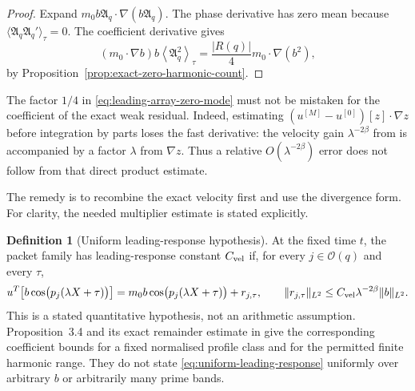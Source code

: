 \documentclass[11pt]{amsart}
\numberwithin{equation}{section}
\theoremstyle{plain}
\theoremstyle{definition}
\newtheorem{definition}[theorem]{Definition}
\theoremstyle{remark}
\begin{document}
\begin{proof}
Expand $m_0b\mathfrak A_q\cdot\nabla(b\mathfrak A_q)$.  The phase derivative
has zero mean because
$\langle\mathfrak A_q\mathfrak A_q'\rangle_\tau=0$.  The coefficient
derivative gives
\begin{equation}
 (m_0\cdot\nabla b)b
 \left\langle\mathfrak A_q^2\right\rangle_\tau
 =\frac{|R(q)|}{4}m_0\cdot\nabla(b^2),
\end{equation}
by Proposition~\ref{prop:exact-zero-harmonic-count}.
\end{proof}

The factor $1/4$ in \eqref{eq:leading-array-zero-mode} must not be mistaken
for the coefficient of the exact weak residual.  Indeed, estimating
$(u^{[M]}-u^{[0]})[z]\cdot\nabla z$ before integration by parts loses the
fast derivative: the velocity gain $\lambda^{-2\beta}$ from
\cite[(33)]{AlpogeBuckmasterCoiculescu2026} is accompanied by a factor
$\lambda$ from $\nabla z$.  Thus a relative $O(\lambda^{-2\beta})$ error does
not follow from that direct product estimate.

The remedy is to recombine the exact velocity first and use the divergence
form.  For clarity, the needed multiplier estimate is stated explicitly.

\begin{definition}[Uniform leading-response hypothesis]
\label{def:uniform-leading-response}
At the fixed time $t$, the packet family has leading-response constant
$C_{\rm vel}$ if, for every $j\in\mathcal O(q)$ and every $\tau$,
\begin{equation}
 u^T\!\left[b\cos\bigl(p_j(\lambda X+\tau)\bigr)\right]
 =m_0b\cos\bigl(p_j(\lambda X+\tau)\bigr)+r_{j,\tau},
 \qquad
 \|r_{j,\tau}\|_{L^2}
 \le C_{\rm vel}\lambda^{-2\beta}\|b\|_{L^2}.
\label{eq:uniform-leading-response}
\end{equation}
This is a stated quantitative hypothesis, not an arithmetic assumption.
Proposition~3.4 and its exact remainder estimate in
\cite{AlpogeBuckmasterCoiculescu2026} give the corresponding coefficient
bounds for a fixed normalised profile class and for the permitted finite
harmonic range.  They do not state \eqref{eq:uniform-leading-response}
uniformly over arbitrary $b$ or arbitrarily many prime bands.
\end{definition}
\end{document}
